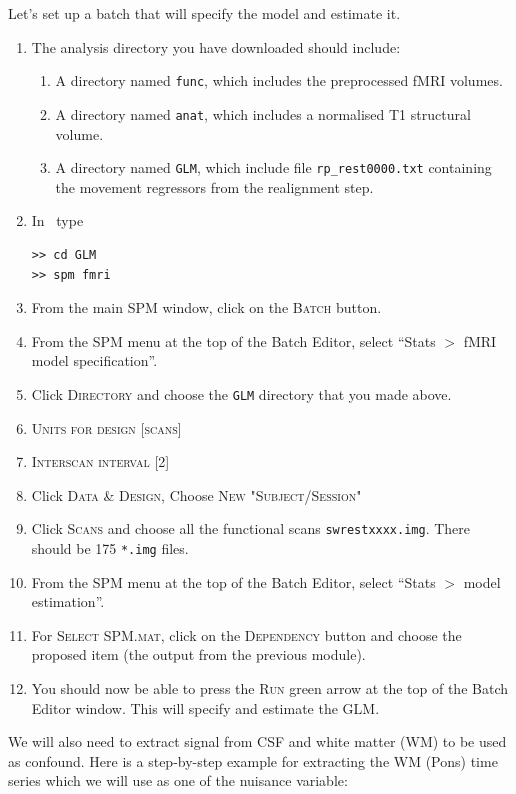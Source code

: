Let's set up a batch that will specify the model and estimate it.

\begin{enumerate}
 \item The analysis directory you have downloaded should include:
 \begin{enumerate}
  \item A directory named \texttt{func}, which includes the preprocessed fMRI volumes.
  \item A directory named \texttt{anat}, which includes a normalised T1 structural volume.
  \item A directory named \texttt{GLM}, which include file \texttt{rp\_rest0000.txt} containing the movement regressors from the realignment step.
 \end{enumerate}
 \item In \matlab\ type
\begin{verbatim}
>> cd GLM
>> spm fmri
\end{verbatim}
 \item From the main SPM window, click on the \textsc{Batch} button.
 \item From the SPM menu at the top of the Batch Editor, select ``Stats $>$ fMRI model specification''.
 \item Click \textsc{Directory} and choose the \texttt{GLM} directory that you made above.
 \item \textsc{Units for design} [\textsc{scans}]
 \item \textsc{Interscan interval} [2]
 \item Click \textsc{Data \& Design}, Choose \textsc{New "Subject/Session"}
 \item Click \textsc{Scans} and choose all the functional scans \texttt{swrestxxxx.img}. There should be 175 \texttt{*.img} files.
 \item From the SPM menu at the top of the Batch Editor, select ``Stats $>$ model estimation''.
 \item For \textsc{Select SPM.mat}, click on the \textsc{Dependency} button and choose the proposed item (the output from the previous module).
 \item You should now be able to press the \textsc{Run} green arrow at the top of the Batch Editor window. This will specify and estimate the GLM.
\end{enumerate}

We will also need to extract signal from CSF and white matter (WM) to be used as confound. Here is a step-by-step example for extracting the WM (Pons) time series which we will use as one of the nuisance variable:

